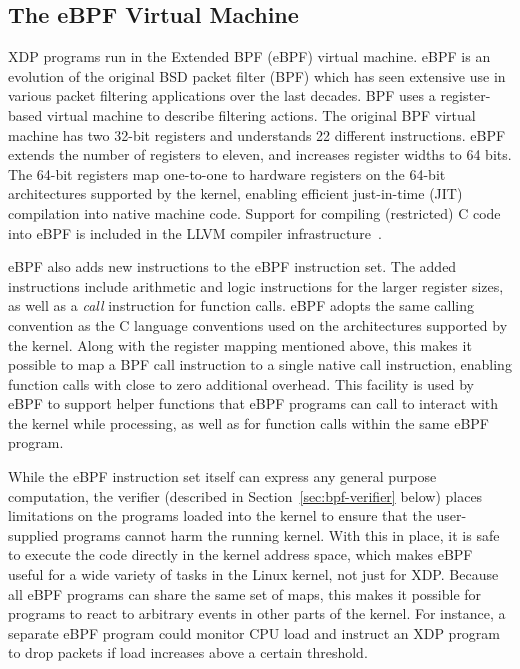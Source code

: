 \documentclass[sigconf]{acmart}
\begin{document}
\subsection{The eBPF Virtual Machine}
\label{sec:bpf-vm}
XDP programs run in the Extended BPF (eBPF) virtual machine. eBPF is an
evolution of the original BSD packet filter (BPF) \cite{mccanne_bsd_1993} which
has seen extensive use in various packet filtering applications over the last
decades. BPF uses a register-based virtual machine to describe filtering
actions. The original BPF virtual machine has two 32-bit registers and
understands 22 different instructions. eBPF extends the number of registers to
eleven, and increases register widths to 64 bits. The 64-bit registers map
one-to-one to hardware registers on the 64-bit architectures supported by the
kernel, enabling efficient just-in-time (JIT) compilation into native machine
code. Support for compiling (restricted) C code into eBPF is included in the
LLVM compiler infrastructure~\cite{llvm}.

eBPF also adds new instructions to the eBPF instruction set. The added
instructions include arithmetic and logic instructions for the larger register
sizes, as well as a \emph{call} instruction for function calls. eBPF adopts the
same calling convention as the C language conventions used on the architectures
supported by the kernel. Along with the register mapping mentioned above, this
makes it possible to map a BPF call instruction to a single native call
instruction, enabling function calls with close to zero additional overhead.
This facility is used by eBPF to support helper functions that eBPF programs can
call to interact with the kernel while processing, as well as for function calls
within the same eBPF program.

While the eBPF instruction set itself can express any general purpose
computation, the verifier (described in Section~\ref{sec:bpf-verifier} below)
places limitations on the programs loaded into the kernel to ensure that the
user-supplied programs cannot harm the running kernel. With this in place, it is
safe to execute the code directly in the kernel address space, which makes eBPF
useful for a wide variety of tasks in the Linux kernel, not just for XDP.
Because all eBPF programs can share the same set of maps, this makes it possible
for programs to react to arbitrary events in other parts of the kernel. For
instance, a separate eBPF program could monitor CPU load and instruct an XDP
program to drop packets if load increases above a certain threshold.
\end{document}
